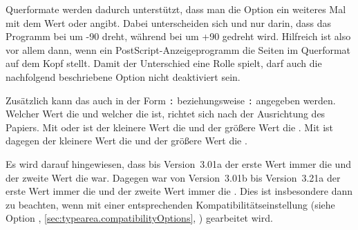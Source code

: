 Querformate werden dadurch unterstützt, dass man die Option ein weiteres Mal mit dem
Wert  oder
 angibt. Dabei
unterscheiden sich  und  nur darin, dass
das Programm  bei  um -90\Unit{\textdegree}
dreht, während bei  um +90\Unit{\textdegree} gedreht
wird. Hilfreich ist  also vor allem dann, wenn ein
PostScript-Anzeigeprogramm die Seiten im Querformat auf dem Kopf stellt.
Damit der Unterschied eine Rolle spielt, darf auch die nachfolgend
beschriebene Option %
 nicht
deaktiviert sein.

Zusätzlich kann das  auch in der Form
\texttt{:}%
 beziehungsweise
\texttt{:}%
 angegeben
werden. Welcher Wert die  und welcher die  ist,
richtet sich nach der Ausrichtung des Papiers. Mit
 oder  ist der
kleinere Wert die  und der größere Wert die . Mit
 ist
dagegen der kleinere Wert die  und der größere Wert die
.

Es wird darauf hingewiesen, dass bis Version~3.01a der
erste Wert immer die  und der zweite Wert die 
war. Dagegen war von Version~3.01b bis Version~3.21a der erste Wert immer die
 und der zweite Wert immer die . Dies ist
insbesondere dann zu beachten, wenn mit einer entsprechenden
Kompatibilitätseinstellung (siehe Option %
,
\autoref{sec:typearea.compatibilityOptions},
) gearbeitet wird.

